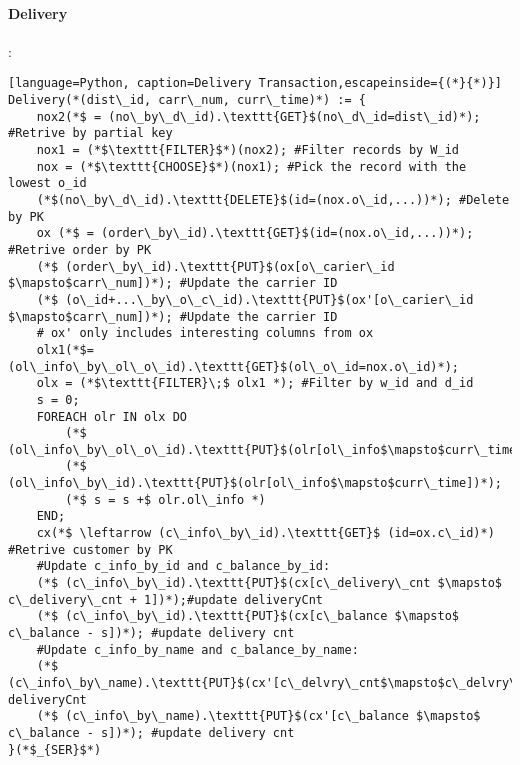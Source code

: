 \documentclass[12pt,letter]{article}
\begin{document}
\paragraph{Delivery}:
\begin{lstlisting}[language=Python, caption=Delivery Transaction,escapeinside={(*}{*)}]
Delivery(*(dist\_id, carr\_num, curr\_time)*) := {
	nox2(*$ = (no\_by\_d\_id).\texttt{GET}$(no\_d\_id=dist\_id)*); #Retrive by partial key
	nox1 = (*$\texttt{FILTER}$*)(nox2); #Filter records by W_id 
	nox = (*$\texttt{CHOOSE}$*)(nox1); #Pick the record with the lowest o_id
	(*$(no\_by\_d\_id).\texttt{DELETE}$(id=(nox.o\_id,...))*); #Delete by PK 
	ox (*$ = (order\_by\_id).\texttt{GET}$(id=(nox.o\_id,...))*); #Retrive order by PK
	(*$ (order\_by\_id).\texttt{PUT}$(ox[o\_carier\_id $\mapsto$carr\_num])*); #Update the carrier ID
	(*$ (o\_id+...\_by\_o\_c\_id).\texttt{PUT}$(ox'[o\_carier\_id $\mapsto$carr\_num])*); #Update the carrier ID
	# ox' only includes interesting columns from ox
	olx1(*$=(ol\_info\_by\_ol\_o\_id).\texttt{GET}$(ol\_o\_id=nox.o\_id)*);
	olx = (*$\texttt{FILTER}\;$ olx1 *); #Filter by w_id and d_id 
	s = 0;
	FOREACH olr IN olx DO
		(*$ (ol\_info\_by\_ol\_o\_id).\texttt{PUT}$(olr[ol\_info$\mapsto$curr\_time])*);
		(*$ (ol\_info\_by\_id).\texttt{PUT}$(olr[ol\_info$\mapsto$curr\_time])*);
		(*$ s = s +$ olr.ol\_info *)
	END;
	cx(*$ \leftarrow (c\_info\_by\_id).\texttt{GET}$ (id=ox.c\_id)*) #Retrive customer by PK
	#Update c_info_by_id and c_balance_by_id:
	(*$ (c\_info\_by\_id).\texttt{PUT}$(cx[c\_delivery\_cnt $\mapsto$ c\_delivery\_cnt + 1])*);#update deliveryCnt
	(*$ (c\_info\_by\_id).\texttt{PUT}$(cx[c\_balance $\mapsto$ c\_balance - s])*); #update delivery cnt
	#Update c_info_by_name and c_balance_by_name:
	(*$ (c\_info\_by\_name).\texttt{PUT}$(cx'[c\_delvry\_cnt$\mapsto$c\_delvry\_cnt+1])*);#update deliveryCnt
	(*$ (c\_info\_by\_name).\texttt{PUT}$(cx'[c\_balance $\mapsto$ c\_balance - s])*); #update delivery cnt
}(*$_{SER}$*)
\end{lstlisting}






































\end{document}
